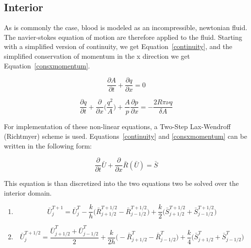 \documentclass[12pt]{article}
\newcommand{\partder}[2]{\frac{\partial #1}{\partial #2}}
\newcommand{\tensor}[1]{\bar{#1}}
\newcommand{\tensplus}[3]{\tensor{#1}_{#2}^{#3}}
\begin{document}
\subsection{Interior}
As is commonly the case, blood is modeled as an incompressible, newtonian fluid. The navier-stokes equation of motion are therefore applied to the fluid. Starting with a simplified version of continuity, we get Equation~\eqref{continuity}, and the simplified conservation of momentum in the x direction we get Equation~\eqref{consxmomentum}.

\begin{equation}
	\label{continuity}
	\partder{A}{t} + \partder{q}{x} = 0
\end{equation}

\begin{equation}
	\label{consxmomentum}
	\partder{q}{t} + \partder{}{x}\Bigg(\frac{q^2}{A}\Bigg) + \frac{A}{p}\partder{p}{x} = -\frac{2R\pi \nu q}{\delta A}
\end{equation}

For implementation of these non-linear equations, a Two-Step Lax-Wendroff (Richtmyer) scheme is used. Equations~\ref{continuity} and \ref{consxmomentum} can be written in the following form:

\begin{equation} 
	\label{discrete1}
	\partder{}{t} \tensor{U} + \partder{}{x} \tensor{R}(\tensor{U}) = \tensor{S}
\end{equation}

This equation is than discretized into the two equations two be solved over the interior domain. 

\begin{enumerate}
	\item
	\begin{equation}
		\label{bigu1}
		\tensplus{U}{j}{T+1} = \tensplus{U}{j}{T} - \frac{k}{h} \Bigg(\tensplus{R}{j+1/2}{T+1/2} - \tensplus{R}{j-1/2}{T+1/2} \Bigg) + \frac{k}{2} \Bigg(\tensplus{S}{j		+1/2}{T+1/2} + \tensplus{S}{j-1/2}{T+1/2} \Bigg)
	\end{equation}
	
	\item
	\begin{equation}
		\label{bigu2}
		\tensplus{U}{j}{T+1/2} = \frac{\tensplus{U}{j+1/2}{T} + \tensplus{U}{j-1/2}{T}}{2} + \frac{k}{2h} \Bigg(-\tensplus{R}{j+1/2}{T} - \tensplus{R}{j-1/2}{T} \Bigg)  		+ \frac{k}{4} \Bigg(\tensplus{S}{j+1/2}{T} + \tensplus{S}{j-1/2}{T} \Bigg)
	\end{equation}
\end{enumerate}
\end{document}
